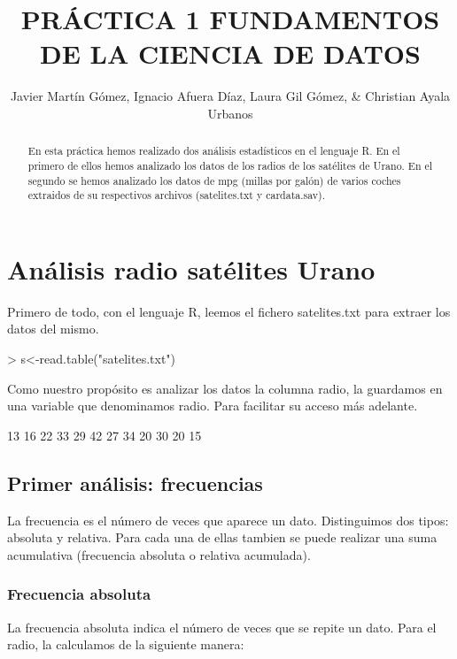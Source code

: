 \documentclass [a4paper] {article}
\title{PRÁCTICA 1 FUNDAMENTOS DE LA CIENCIA DE DATOS}
\author{Javier Martín Gómez, Ignacio Afuera Díaz, Laura Gil Gómez, & Christian Ayala Urbanos}
\begin{document}
\maketitle

\begin{abstract}
En esta práctica hemos realizado dos análisis estadísticos en el lenguaje R. En el primero de ellos hemos analizado los
datos de los radios de los satélites de Urano. En el segundo se hemos analizado los datos de mpg (millas por galón) de varios
coches extraidos de su respectivos archivos (satelites.txt y cardata.sav).
\end{abstract}

\newpage
\tableofcontents
\newpage


\section{Análisis radio satélites Urano}

Primero de todo, con el lenguaje R, leemos el fichero satelites.txt para extraer los datos del mismo. 

\begin{Schunk}
\begin{Sinput}
> s<-read.table("satelites.txt")
\end{Sinput}
\end{Schunk}

Como nuestro propósito es analizar los datos la columna radio, la guardamos en una variable que denominamos radio.
Para facilitar su acceso más adelante.

\begin{Schunk}
\begin{Soutput}
 [1] 13 16 22 33 29 42 27 34 20 30 20 15
\end{Soutput}
\end{Schunk}


\subsection{Primer análisis: frecuencias}
La frecuencia es el número de veces que aparece un dato. Distinguimos dos tipos: absoluta y relativa.
Para cada una de ellas tambien se puede realizar una suma acumulativa (frecuencia absoluta o relativa acumulada).
\subsubsection{Frecuencia absoluta}
La frecuencia absoluta indica el número de veces que se repite un dato. Para el radio, la calculamos de la siguiente manera:
\end{document}

